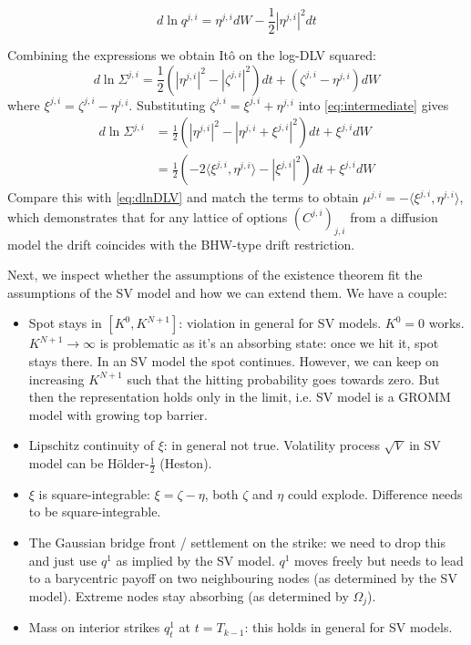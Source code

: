 \documentclass[11pt]{article}
\newcommand{\ip}[2]{\langle #1,#2\rangle}
\theoremstyle{plain}
\theoremstyle{definition}
\theoremstyle{remark}
\begin{document}
\begin{equation*}
    d \ln q^{j, i} = \eta^{j, i} dW - \frac{1}{2} |\eta^{j, i}|^2 dt  
\end{equation*}

Combining the expressions we obtain Itô on the log-DLV squared: 
\begin{equation}
    \label{eq:intermediate}
    d \ln \Sigma^{j, i} = \frac{1}{2} \left( |\eta^{j, i}|^2 -  |\zeta^{j, i}|^2 \right)dt + \left( \zeta^{j, i}  - \eta^{j, i} \right)dW  
\end{equation}
where $\xi^{j, i} = \zeta^{j, i} - \eta^{j, i}$. Substituting $\zeta^{j, i} = \xi^{j, i} + \eta^{j, i}$ into \eqref{eq:intermediate} gives 
\begin{align*}
    d \ln \Sigma^{j, i} &= \frac{1}{2} \left( |\eta^{j, i}|^2 -  |\eta^{j, i} + \xi^{j, i}|^2 \right)dt + \xi^{j, i} dW  
    \\ 
    &= \frac{1}{2} \left( - 2\ip{\xi^{j, i}}{\eta^{j, i}} - |\xi^{j,i}|^2  \right)dt + \xi^{j, i} dW 
\end{align*}
Compare this with \eqref{eq:dlnDLV} and match the terms to obtain $\mu^{j, i} = -\ip{\xi^{j,i}}{\eta^{j,i}}$, which demonstrates that for any lattice of options $(C^{j, i})_{j, i}$ from a diffusion model the drift coincides with the BHW-type drift restriction. 

Next, we inspect whether the assumptions of the existence theorem fit the assumptions of the SV model and how we can extend them. We have a couple: 
\begin{itemize}
    \item Spot stays in $[K^0, K^{N+1}]$: violation in general for SV models. $K^0 = 0$ works. $K^{N+1} \rightarrow \infty $ is problematic as it's an absorbing state: once we hit it, spot stays there. In an SV model the spot continues. However, we can keep on increasing $K^{N+1}$ such that the hitting probability goes towards zero. But then the representation holds only in the limit, i.e. SV model is a GROMM model with growing top barrier. 
    \item Lipschitz continuity of $\xi$: in general not true. Volatility process $\sqrt V$ in SV model can be Hölder-$\tfrac{1}{2}$ (Heston). 
    \item $\xi$ is square-integrable: $\xi = \zeta - \eta$, both $\zeta$ and $\eta$ could explode. Difference needs to be  square-integrable. 
    \item The Gaussian bridge front / settlement on the strike: we need to drop this and just use $q^1$ as implied by the SV model. $q^1$ moves freely but needs to lead to a barycentric payoff on two neighbouring nodes (as determined by the SV model). Extreme nodes stay absorbing (as determined by $\Omega_j$). 
    \item Mass on interior strikes $q^1_t$ at $t=T_{k-1}$: this holds in general for SV models. 
\end{itemize}
\end{document}
